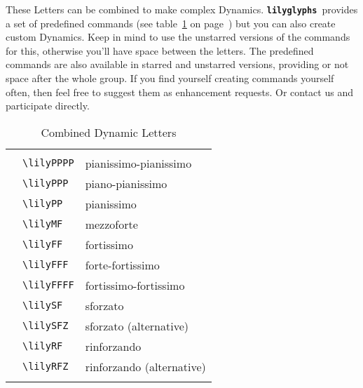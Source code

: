\documentclass{article}
\newcommand{\lilyglyphs}{\texttt{\textbf{lilyglyphs }}}
\newcommand*{\cmd}[1]{\texttt{\textbackslash #1}}
\newcommand{\tmpCaption}{} %
\newcommand{\tmpLabel}{}
\newenvironment{reftable}[2]
	{%
		\renewcommand{\tmpCaption}{#1}
		\renewcommand{\tmpLabel}{#2}
		\begin{table}[ht]
		\begin{center}
		\begin{tabular}[t]{lll}
		\hline
		&\\
	}
	{%
		&\\
		\hline
		\end{tabular}
		\caption{\tmpCaption}
		\label{table:\tmpLabel}
		\end{center}
		\end{table}
	}
\begin{document}
These Letters can be combined to make complex Dynamics. \lilyglyphs provides a set of predefined commands (see table~\ref{table:combinedDynLetters} on page~\pageref{table:combinedDynLetters}) but you can also create custom Dynamics. Keep in mind to use the unstarred versions of the commands for this, otherwise you'll have space between the letters. The predefined commands are also available in starred and unstarred versions, providing or not space after the whole group.
If you find yourself creating commands yourself often, then feel free to suggest them as enhancement requests. Or contact us and participate directly.

\begin{reftable}{Combined Dynamic Letters}{combinedDynLetters}
\lilyPPPP* & \cmd{lilyPPPP} & pianissimo-pianissimo\\
\lilyPPP* & \cmd{lilyPPP} & piano-pianissimo\\
\lilyPP* & \cmd{lilyPP} & pianissimo\\
\lilyMF* & \cmd{lilyMF} & mezzoforte\\
\lilyFF* & \cmd{lilyFF} & fortissimo\\
\lilyFFF* & \cmd{lilyFFF} & forte-fortissimo\\
\lilyFFFF* & \cmd{lilyFFFF} & fortissimo-fortissimo\\

\lilySF* & \cmd{lilySF} & sforzato\\
\lilySFZ* & \cmd{lilySFZ} & sforzato (alternative)\\
\lilyRF* & \cmd{lilyRF} & rinforzando\\
\lilyRFZ* & \cmd{lilyRFZ} & rinforzando (alternative)\\

\end{reftable}
\end{document}
